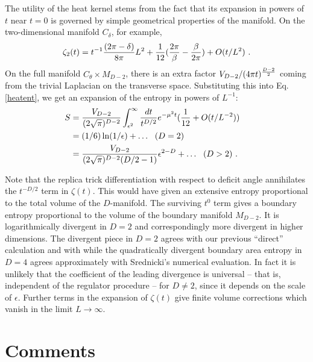 \documentclass[12pt]{article}
\begin{document}
The utility of the heat kernel stems from the fact that its expansion
in powers of $t$ near $t=0$ is governed by simple geometrical properties
of the manifold\cite{balian,alvarez}. On the two-dimensional manifold
$C_\delta$, for example,
\begin{equation}
\zeta_2(t) = t^{-1}{(2\pi-\delta)\over 8\pi} L^2 +
	{1\over {12}} ({2\pi \over \beta} - {\beta \over 2\pi})
+ O(t/L^2) ~.
\end{equation}
On the full manifold $C_\theta\times M_{D-2}$, there is an extra factor
$V_{D-2}/(4\pi t)^{{D-2\over 2}}$ coming from the trivial Laplacian on the
transverse space. Substituting this into Eq.\ref{heatent}, we get an
expansion of the entropy in powers of $L^{-1}$:
\begin{align}
S & = {V_{D-2}\over(2\sqrt{\pi})^{D-2}}\int_{\epsilon^2}^\infty {dt\over
t^{D/2}}
	e^{-\mu^2 t}({1\over 12}+O(t/L^{-2}))\cr
    & = (1/6)\ln(1/\epsilon) + \ldots~~(D=2)\cr
    & = {V_{D-2}\over(2\sqrt{\pi})^{D-2}(D/2-1)}\epsilon^{2-D}+\ldots~~(D>2)~.
\end{align}

Note that the replica trick differentiation with respect to deficit
angle annihilates the $t^{-D/2}$ term in $\zeta(t)$. This would have given
an extensive entropy proportional to the total volume of the $D$-manifold.
The surviving $t^{0}$ term gives a boundary entropy proportional to the volume
of the boundary manifold $M_{D-2}$. It is logarithmically divergent in $D=2$
and correspondingly more divergent in higher dimensions. The divergent piece in
$D=2$ agrees with our previous ``direct'' calculation and with \cite{Holzhey}
while the quadratically divergent boundary area entropy in
$D=4$ agrees approximately with
 Srednicki's numerical evaluation\cite{Srednicki}. In fact it is
unlikely that the coefficient of the leading divergence is
universal -- that is, independent of the regulator
procedure -- for $D \not= 2$, since it depends on the scale of
$\epsilon$.
Further terms in the expansion of $\zeta(t)$ give
finite volume corrections which vanish in the limit $L\to\infty$.

\section{Comments}
\end{document}
